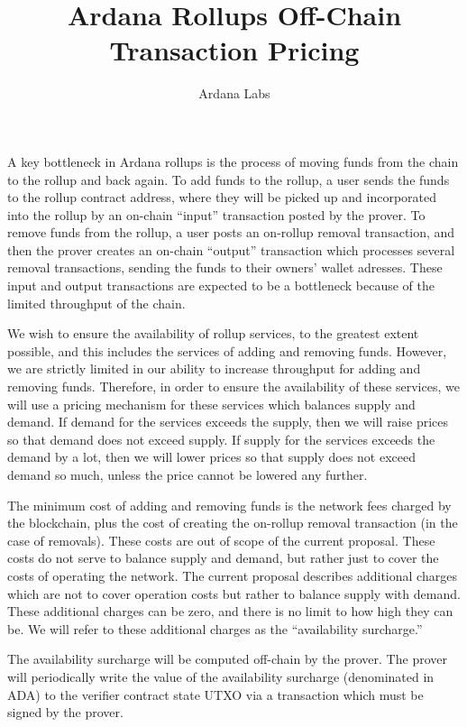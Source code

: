 \documentclass[12pt]{article}
\title{Ardana Rollups Off-Chain Transaction Pricing}
\author{Ardana Labs}
\begin{document}
\maketitle


A key bottleneck in Ardana rollups is the process of moving funds from the chain to the rollup and back again. To add funds to the rollup, a user sends the funds to the rollup contract address, where they will be picked up and incorporated into the rollup by an on-chain ``input'' transaction posted by the prover. To remove funds from the rollup, a user posts an on-rollup removal transaction, and then the prover creates an on-chain ``output'' transaction which processes several removal transactions, sending the funds to their owners' wallet adresses. These input and output transactions are expected to be a bottleneck because of the limited throughput of the chain. 

We wish to ensure the availability of rollup services, to the greatest extent possible, and this includes the services of adding and removing funds. However, we are strictly limited in our ability to increase throughput for adding and removing funds. Therefore, in order to ensure the availability of these services, we will use a pricing mechanism for these services which balances supply and demand. If demand for the services exceeds the supply, then we will raise prices so that demand does not exceed supply. If supply for the services exceeds the demand by a lot, then we will lower prices so that supply does not exceed demand so much, unless the price cannot be lowered any further.

The minimum cost of adding and removing funds is the network fees charged by the blockchain, plus the cost of creating the on-rollup removal transaction (in the case of removals). These costs are out of scope of the current proposal. These costs do not serve to balance supply and demand, but rather just to cover the costs of operating the network. The current proposal describes additional charges which are not to cover operation costs but rather to balance supply with demand. These additional charges can be zero, and there is no limit to how high they can be. We will refer to these additional charges as the ``availability surcharge.''

The availability surcharge will be computed off-chain by the prover. The prover will periodically write the value of the availability surcharge (denominated in ADA) to the verifier contract state UTXO via a transaction which must be signed by the prover.
\end{document}
